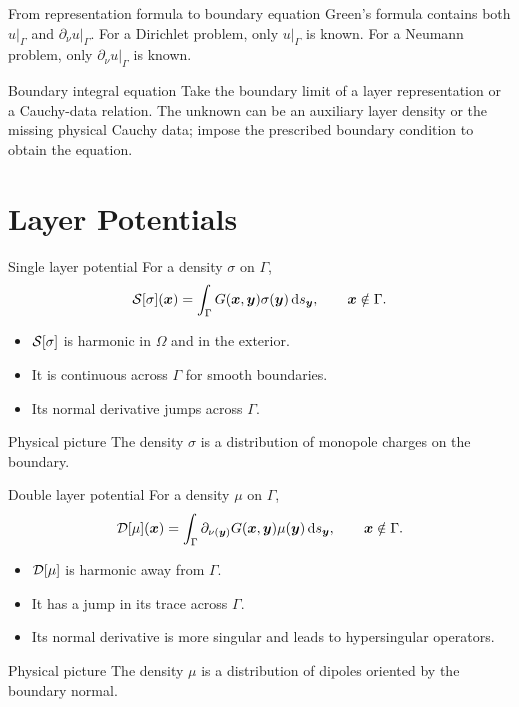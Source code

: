 \documentclass[aspectratio=169,11pt]{beamer}
\newcommand{\dd}{\,\mathrm d}
\newcommand{\x}{\bm{x}}
\newcommand{\y}{\bm{y}}
\begin{document}
\begin{frame}{From representation formula to boundary equation}
\small
Green's formula contains both $u|_\Gamma$ and $\partial_\nu u|_\Gamma$.
For a Dirichlet problem, only $u|_\Gamma$ is known.
For a Neumann problem, only $\partial_\nu u|_\Gamma$ is known.

\begin{block}{Boundary integral equation}
Take the boundary limit of a layer representation or a Cauchy-data relation.
The unknown can be an auxiliary layer density or the missing physical Cauchy
data; impose the prescribed boundary condition to obtain the equation.
\end{block}
\end{frame}

\section{Layer Potentials}

\begin{frame}{Single layer potential}
\small
For a density $\sigma$ on $\Gamma$,
\[
  \Sop[\sigma](\x)=
  \int_{\Gamma}G(\x,\y)\sigma(\y)\dd s_{\y},
  \qquad \x\notin\Gamma.
\]

\begin{itemize}
  \item $\mathcal{S}[\sigma]$ is harmonic in $\Omega$ and in the exterior.
  \item It is continuous across $\Gamma$ for smooth boundaries.
  \item Its normal derivative jumps across $\Gamma$.
\end{itemize}

\begin{block}{Physical picture}
The density $\sigma$ is a distribution of monopole charges on the boundary.
\end{block}
\end{frame}

\begin{frame}{Double layer potential}
\small
For a density $\mu$ on $\Gamma$,
\[
  \Dop[\mu](\x)=
  \int_{\Gamma}\partial_{\nu(\y)}G(\x,\y)\mu(\y)\dd s_{\y},
  \qquad \x\notin\Gamma.
\]

\begin{itemize}
  \item $\mathcal{D}[\mu]$ is harmonic away from $\Gamma$.
  \item It has a jump in its trace across $\Gamma$.
  \item Its normal derivative is more singular and leads to hypersingular
  operators.
\end{itemize}

\begin{block}{Physical picture}
The density $\mu$ is a distribution of dipoles oriented by the boundary normal.
\end{block}
\end{frame}
\end{document}
